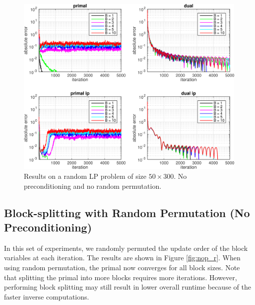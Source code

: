 \documentclass{article}
\begin{document}
\begin{figure}[h]
	\includegraphics[width=\textwidth]{../figures/noprecond_norndperm.png}
	\caption{Results on a random LP problem of size $50 \times 300$. No preconditioning and no random permutation.}
	\label{fig:nop_nor}
\end{figure}

\subsection*{Block-splitting with Random Permutation (No Preconditioning)}

In this set of experiments, we randomly permuted the update order of the block variables at each iteration. The results are shown in Figure \ref{fig:nop_r}. When using random permutation, the primal now converges for all block sizes. Note that splitting the primal into more blocks requires more iterations. However, performing block splitting may still result in lower overall runtime because of the faster inverse computations. 
\end{document}
